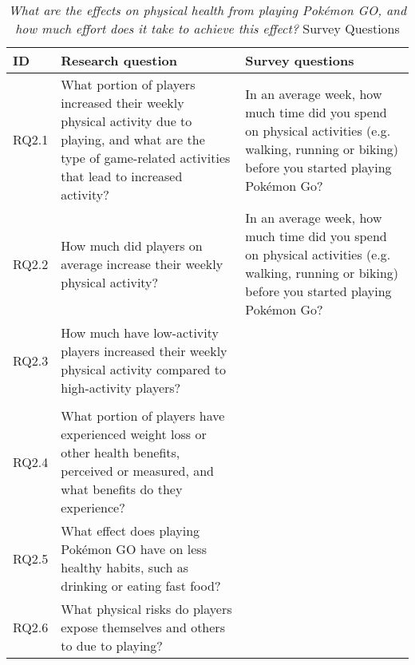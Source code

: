 \begin{table}[h!]
\caption{\emph{What are the effects on physical health from playing Pokémon GO, and how much effort does it take to achieve this effect?} Survey Questions}
\centering
\label{tbl:rg2-survey-questions}
\begin{tabularx}{\textwidth}{|l|X|X|}
	\hline
	\textbf{ID} & \textbf{Research question} & \textbf{Survey questions}\\
	\hline\hline
	
	RQ2.1 & What portion of players increased their weekly physical activity due to playing, and what are the type of game-related activities that lead to increased activity? & In an average week, how much time did you spend on physical activities (e.g. walking, running or biking) before you started playing Pokémon Go? \\
	\hline
	
	RQ2.2 & How much did players on average increase their weekly physical activity? & In an average week, how much time did you spend on physical activities (e.g. walking, running or biking) before you started playing Pokémon Go?\\
	\hline
	
	RQ2.3 & How much have low-activity players increased their weekly physical activity compared to high-activity players? & \\
	\cline{3-3}
	
	& & \\
	\hline
	
	RQ2.4 & What portion of players have experienced weight loss or other health benefits, perceived or measured, and what benefits do they experience? & \\
	\hline
	
	RQ2.5 & What effect does playing Pokémon GO have on less healthy \todo{(consider wording)} habits, such as drinking or eating fast food? & \\
	\hline
	
	RQ2.6 & What physical risks do players expose themselves and others to due to playing? & \\
	\hline
\end{tabularx}
\end{table}
